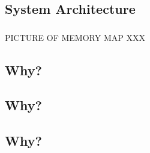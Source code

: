 \documentclass{beamer}
\begin{document}

\subsection{System Architecture}




\begin{frame}[fragile]
\frametitle{\insertsubsection}


PICTURE OF MEMORY MAP XXX 

\end{frame}




\subsection{Why?}

\begin{frame}[fragile]
\frametitle{\insertsubsection}

\end{frame}


\subsection{Why?}

\begin{frame}[fragile]
\frametitle{\insertsubsection}

\end{frame}


\subsection{Why?}

\begin{frame}[fragile]
\frametitle{\insertsubsection}

\end{frame}
\end{document}
